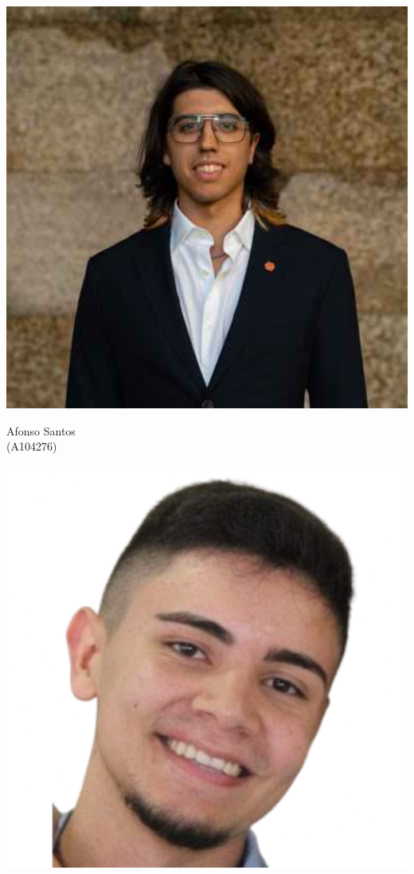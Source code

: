{\begin{center}
    \begin{minipage}{120pt}
        \includegraphics[scale=0.2]{images/team/dionisio.png}
        \parbox{120pt}{\centering\normalsize{Afonso Santos \\ (A104276)}}
    \end{minipage}
    \hspace{0.5cm}
    \begin{minipage}{120pt}
        \includegraphics[scale=0.2]{images/team/afonso.png}

\end{minipage}
\end{center}}
